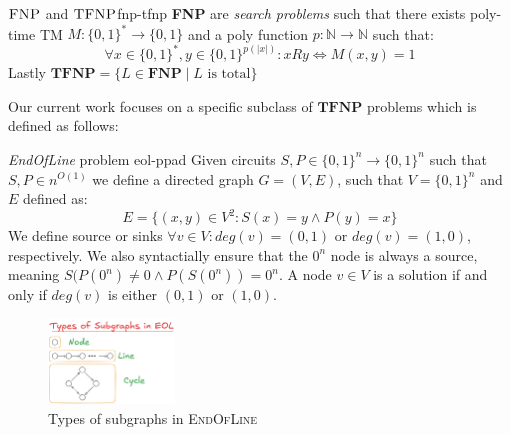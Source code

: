\begin{definitionbox}{$\textnormal{\textsc{FNP}}$ and $\textnormal{\textsc{TFNP}}$}{fnp-tfnp}
    \textbf{FNP} are \textit{search problems} such that there exists poly-time TM $M: \{0,1\}^* \to \{0,1\}$
    and a poly function $p : \mathbb{N} \to \mathbb{N}$ such that:
    $$
    \forall x \in \{0,1\}^*, y \in \{0,1\}^{p(|x|)}: xRy \iff M(x,y) = 1
    $$
    Lastly $\textbf{TFNP} = \{L \in \textbf{FNP} \mid L \text{ is total}\}$
\end{definitionbox}

%


Our current work focuses on a specific subclass of $\textbf{TFNP}$ problems
which is defined as follows:

\begin{definitionbox}{\textit{EndOfLine} problem \cite{papadimitriou_ComplexityParityArgument_1994}}{eol-ppad}
    Given circuits $S, P \in \{0,1\}^n \to \{0,1\}^n$ such that $S,P \in n^{O(1)}$
    we define a directed graph $G = (V,E)$, such that $V= \{0,1\}^n$ and $E$ defined as:
    $$
    E = \{(x,y) \in V^2: S(x) = y \wedge P(y) = x\}
    $$
    We define source or sinks $\forall v \in V: \textit{deg}(v) = (0,1)$ or
    $\textit{deg}(v) = (1,0)$, respectively. 
    We also syntactially ensure that the $0^n$ node is always a source, meaning
    $S(P(0^n) \neq 0 \wedge P(S(0^n)) = 0^n$.
    A node $v \in V$ is a solution if and only if $\textit{deg}(v)$ is either
    $(0,1)$  or $(1,0)$.
\end{definitionbox}


\begin{figure}[h!]
    \centering
    \includegraphics[width=0.3\textwidth]{assets/eol-subgraphs.png}
    \caption{Types of subgraphs in \textsc{EndOfLine}}\label{fig:eol-subgraphs}
\end{figure}


